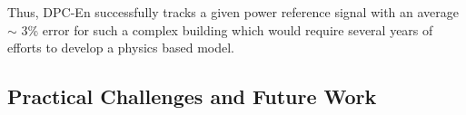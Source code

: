 Thus, DPC-En successfully tracks a given power reference signal with an average $\sim$ 3\% error for such a complex building which would require several years of efforts to develop a physics based model.




\subsection{Practical Challenges and Future Work}
\label{SS:challenges}


